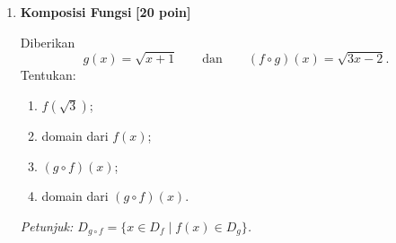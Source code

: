 \documentclass[12pt,a4paper]{article}
\newcommand{\poin}[1]{\hfill\textbf{[#1 poin]}}
\begin{document}
\begin{enumerate}
\begin{enumerate}
      \item Penggantian $x$ menjadi $x-2$ menggeser grafik $2$ satuan ke kanan.
        Pengurangan $3$ di luar kuadrat menurunkan semua nilai fungsi sebesar $3$.
        Jadi, grafik $f$ digeser
        $\boxed{2\text{ satuan ke kanan dan }3\text{ satuan ke bawah}}$.
        Setiap titik $(a,a^2)$ pada $f$ berpindah ke $(a+2,a^2-3)$ pada $g$.

      \item Bentuk puncak parabola adalah $y=(x-h)^2+k$, dengan puncak $(h,k)$.
        Pada soal, $h=2$ dan $k=-3$.
        Maka titik puncaknya $\boxed{(2,-3)}$.
        Ini juga hasil pergeseran puncak awal $(0,0)$.

      \item Domain adalah himpunan nilai $x$ yang dapat dimasukkan ke fungsi.
        Operasi pengurangan dan pengkuadratan terdefinisi untuk setiap bilangan real.
        Karena itu, tidak ada pembatasan nilai $x$.
        Jadi, $\boxed{D_g=\mathbb{R}=(-\infty,\infty)}$.

      \item Kuadrat suatu bilangan real selalu tak negatif, sehingga $(x-2)^2\ge0$.
        Akibatnya, $g(x)=(x-2)^2-3\ge-3$.
        Nilai minimum $-3$ tercapai saat $x=2$.
        Parabola terbuka ke atas, sehingga semua nilai di atas $-3$ juga tercapai.
        Jadi, range atau daerah hasilnya adalah $\boxed{R_g=[-3,\infty)}$.
        Tanda kurung siku dipakai karena nilai $-3$ termasuk daerah hasil.
    \end{enumerate}
    \endgroup

  \newpage
  \item \textbf{Komposisi Fungsi} \poin{20}

    Diberikan
    \[
      g(x)=\sqrt{x+1}
      \qquad\text{dan}\qquad
      (f\circ g)(x)=\sqrt{3x-2}.
    \]
    Tentukan:
    \begin{enumerate}
      \item $f(\sqrt{3})$;
      \item domain dari $f(x)$;
      \item $(g\circ f)(x)$;
      \item domain dari $(g\circ f)(x)$.
    \end{enumerate}
    \textit{Petunjuk: $D_{g\circ f}=\{x\in D_f\mid f(x)\in D_g\}$.}


\end{enumerate}
\end{document}
